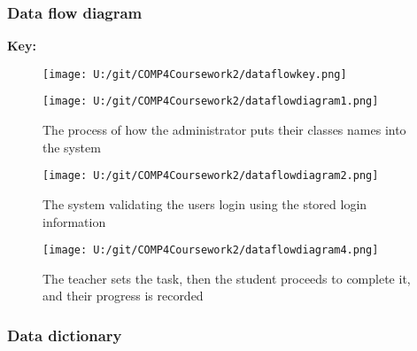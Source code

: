 \subsubsection{Data flow diagram}

\textbf{Key: }

\begin{figure}[H]
    \texttt{[image: U:/git/COMP4Coursework2/dataflowkey.png]}
\end{figure}

\begin{figure}[H]
    \texttt{[image: U:/git/COMP4Coursework2/dataflowdiagram1.png]}
    \caption{The process of how the administrator puts their classes names into the system} \label{fig:print_function_result}
\end{figure}

\begin{figure}[H]
    \texttt{[image: U:/git/COMP4Coursework2/dataflowdiagram2.png]}
    \caption{The system validating the users login using the stored login information} \label{fig:print_function_result}
\end{figure}

\begin{figure}[H]
    \texttt{[image: U:/git/COMP4Coursework2/dataflowdiagram4.png]}
    \caption{The teacher sets the task, then the student proceeds to complete it, and their progress is recorded} \label{fig:print_function_result}
\end{figure}

\subsubsection{Data dictionary}

